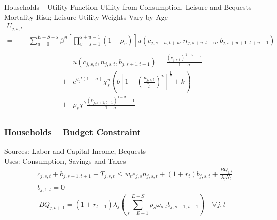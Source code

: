 \documentclass{beamer}
\begin{document}
  \begin{frame}{Households -- Utility Function}\label{Utility Function}
    Utility from Consumption, Leisure and Bequests \\
    Mortality Risk;  Leisure Utility Weights Vary by Age
    \begin{equation}
      \begin{split}
        U_{j,s,t} \\
        = & \sum_{u=0}^{E+S-s}\beta^u\left[\prod_{v=s-1}^{s+u-1}(1-\rho_v)\right] u\left(c_{j,s+u,t+u},n_{j,s+u,t+u},b_{j,s+u+1,t+u+1}\right) \nonumber \\
      \end{split}
    \end{equation}
    \begin{equation}
      \begin{split}
        & u\left(c_{j,s,t},n_{j,s,t},b_{j,s+1,t+1}\right) = \frac{\left(c_{j,s,t}\right)^{1-\sigma} - 1}{1-\sigma} \\
        + & e^{g_y t(1-\sigma)}\chi^n_s\left(b\left[1 - \left(\frac{n_{j,s,t}}{\tilde{l}}\right)^\upsilon\right]^\frac{1}{\upsilon} + k\right) \\
        + & \rho_s\chi^b\frac{\left(b_{j,s+1,t+1}\right)^{1-\sigma} - 1}{1-\sigma} \nonumber \\
      \end{split}
    \end{equation}
    \hyperlink{elliptic}{}
  \end{frame}

  \begin{frame}
    \frametitle{Households -- Budget Constraint}
    Sources: Labor and Capital Income, Bequests \\
    Uses: Consumption, Savings and Taxes
    \begin{equation}
      \begin{split}
        & c_{j,s,t} + b_{j,s+1,t+1} + T_{j,s,t} \leq  w_t e_{j,s}n_{j,s,t} + \left(1 + r_t\right) b_{j,s,t} + \frac{BQ_{j,t}}{\lambda_jN_t}  \\
        & b_{j,1,t} = 0  \nonumber
      \end{split}
    \end{equation}
    \begin{equation}
      BQ_{j,t+1} = (1+r_{t+1})\lambda_j\left(\sum_{s=E+1}^{E+S}\rho_s\omega_{s,t}b_{j,s+1,t+1}\right) \quad\forall j,t \nonumber
    \end{equation}
  \end{frame}
\end{document}
